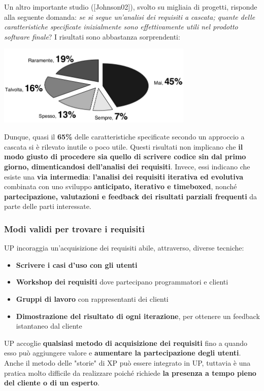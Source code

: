 \documentclass[12pt]{article}
\begin{document}
Un altro importante studio ([Johnson02]), svolto su migliaia di progetti, risponde alla seguente domanda: \textit{se si segue un'analisi dei requisiti a cascata; quante delle caratteristiche specificate inizialmente sono effettivamente utili nel prodotto software finale}?
I risultati sono abbastanza sorprendenti:
\begin{center}
    \includegraphics[width = 0.70\textwidth]{Images/30.png}
\end{center}
Dunque, quasi il \textbf{65\%} delle caratteristiche specificate secondo un approccio a cascata si è rilevato inutile o poco utile.
Questi risultati non implicano che \textbf{il modo giusto di procedere sia quello di scrivere codice sin dal primo giorno, dimenticandosi dell'analisi dei requisiti}.
Invece, essi indicano che esiste una \textbf{via intermedia}: \textbf{l'analisi dei requisiti iterativa ed evolutiva} combinata con uno sviluppo \textbf{anticipato, iterativo e timeboxed}, nonché \textbf{partecipazione, valutazioni e feedback dei risultati parziali frequenti} da parte delle parti interessate.
\subsubsection{Modi validi per trovare i requisiti}
UP incoraggia un'acquisizione dei requisiti abile, attraverso, diverse tecniche:
\begin{itemize}
    \item \textbf{Scrivere i casi d'uso con gli utenti}
    \item \textbf{Workshop dei requisiti} dove partecipano programmatori e clienti
    \item \textbf{Gruppi di lavoro} con rappresentanti dei clienti
    \item \textbf{Dimostrazione del risultato di ogni iterazione}, per ottenere un feedback istantaneo dal cliente
\end{itemize}
UP accoglie \textbf{qualsiasi metodo di acquisizione dei requisiti} fino a quando esso può aggiungere valore e \textbf{aumentare la partecipazione degli utenti}.
Anche il metodo delle "storie" di XP può essere integrato in UP, tuttavia è una pratica molto difficile da realizzare poiché richiede \textbf{la presenza a tempo pieno del cliente o di un esperto}.
\end{document}
